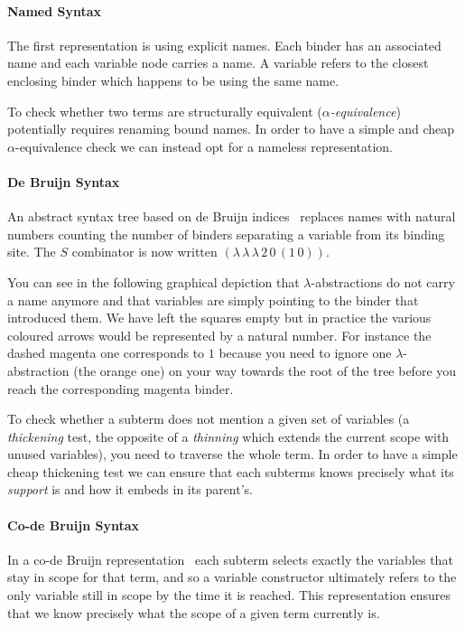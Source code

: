 \paragraph{Named Syntax}
The first representation is using explicit names. Each binder has an associated
name and each variable node carries a name. A variable refers to the closest enclosing
binder which happens to be using the same name.


To check whether two terms are structurally equivalent (\emph{$\alpha$-equivalence})
potentially requires renaming bound names.
%
In order to have a simple and cheap $\alpha$-equivalence check we can instead opt
for a nameless representation.

\paragraph{De Bruijn Syntax}
An abstract syntax tree based on de Bruijn indices~\cite{MANUAL:journals/math/debruijn72}
replaces names with natural numbers counting the number of binders separating a variable
from its binding site.
%
The $S$ combinator is now written $(\lambda\, \lambda\, \lambda\, 2\, 0\, (1\, 0))$.

You can see in the following graphical depiction that
$\lambda$-abstractions do not carry a name anymore and that variables are simply pointing
to the binder that introduced them. We have left the squares empty but in practice
the various coloured arrows would be represented by a natural number.
%
For instance the {\color{magenta}dashed magenta} one corresponds to $1$
because you need to ignore one $\lambda{}$-abstraction
(the {\color{orange}orange} one) on your way towards the root of the tree
before you reach the corresponding magenta binder.


To check whether a subterm does not mention a given set of variables
(a \emph{thickening} test, the opposite of a \emph{thinning} which extends the
current scope with unused variables), you need to traverse the whole term.
%
In order to have a simple cheap thickening test we can ensure that each subterms
knows precisely what its \emph{support} is and how it embeds
in its parent's.

\paragraph{Co-de Bruijn Syntax}
In a co-de Bruijn
representation~\cite{DBLP:journals/corr/abs-1807-04085} each subterm
selects exactly the variables that stay in scope for that term,
and so a variable constructor ultimately refers to the only variable still
in scope by the time it is reached.
%
This representation ensures that we know precisely what the scope of a given term
currently is.


